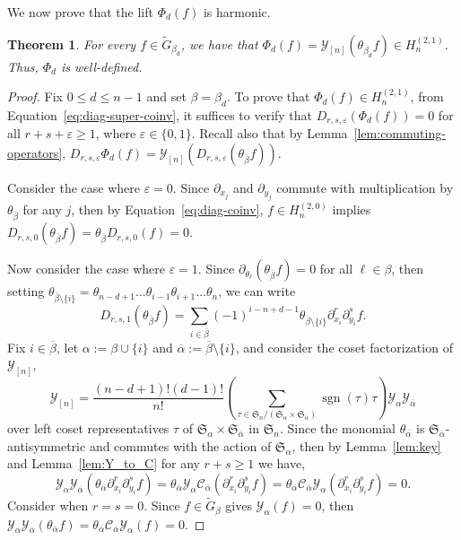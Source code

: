 \documentclass[11pt, noadjust, reqno]{amsart}
\newtheorem{theorem}{Theorem}[section]
\theoremstyle{definition}
\theoremstyle{remark}
\numberwithin{equation}{section}
\newcommand{\0}{\emptyset}
\renewcommand{\S}{\mathfrak{S}}
\newcommand{\cC}{\mathcal{C}}
\newcommand{\cY}{\mathcal{Y}}
\DeclareMathOperator{\sgn}{sgn}
\begin{document}
We now prove that the lift $\Phi_d(f)$ is harmonic.

\begin{theorem}\label{thm:harmonic-2-1}
    For every $f \in \widetilde{G}_{\beta_d}$, we have that $\Phi_d(f) = \cY_{[n]} (\theta_{\overline{\beta_d}} f) \in H_n^{(2,1)}$. Thus, $\Phi_d$ is well-defined.
\end{theorem}

\begin{proof} Fix $0\leq d \leq n-1$ and set $\beta = \beta_d$. 
    To prove that $\Phi_d(f) \in H_n^{(2,1)}$, from Equation~\eqref{eq:diag-super-coinv}, it suffices to verify that $D_{r,s,\varepsilon}(\Phi_d(f)) = 0$ for all $r+s+\varepsilon \geq 1$, where $\varepsilon \in \{0,1\}$.
    Recall also that by Lemma~\ref{lem:commuting-operators}, $D_{r,s,\varepsilon} \Phi_d(f) = \cY_{[n]}(D_{r,s,\varepsilon}(\theta_{\overline{\beta}} f))$.

    Consider the case where $\varepsilon=0$. 
    Since $\partial_{x_j}$ and $\partial_{y_j}$ commute with multiplication by $\theta_{\overline{\beta}}$ for any $j$, then by Equation~\eqref{eq:diag-coinv}, $f \in H_n^{(2,0)}$ implies $D_{r,s,0}(\theta_{\overline{\beta}} f) = \theta_{\overline{\beta}} D_{r,s,0}( f) = 0$.

    Now consider the case where $\varepsilon=1$.
    Since $\partial_{\theta_\ell}(\theta_{{\overline{\beta}}} f)=0$ for all $\ell \in \beta$, 
    then setting $\theta_{{\overline{\beta}} \setminus \{i\}}= \theta_{n-d+1} \dots \theta_{i-1} \theta_{i+1} \dots \theta_n$,
    we can write
    \begin{equation*}
        D_{r,s,1} (\theta_{\overline{\beta}} f) = 
        \sum_{i \in {\overline{\beta}}} (-1)^{i-n+d-1} \theta_{{\overline{\beta}} \setminus \{i\}} \partial_{x_i}^r \partial_{y_i}^s f.
    \end{equation*}
    Fix $i \in {\overline{\beta}}$, let $\alpha := \beta \cup \{i\}$ and $\overline{\alpha} := {\overline{\beta}} \setminus \{i\}$, and consider the coset factorization of $\cY_{[n]}$,
    \[\cY_{[n]} = \frac{(n-d+1)!(d-1)!}{n!}\left(\sum_{\tau \in  \S_n /  (\S_\alpha \times \S_{\overline{\alpha}})} \sgn(\tau) \tau \right) \cY_\alpha \cY_{\overline{\alpha}}
    \]
    over left coset representatives $\tau$ of $\mathfrak{S}_\alpha \times \mathfrak{S}_{\overline{\alpha}}$ in $\mathfrak{S}_n$. 
    Since the monomial $\theta_{\overline{\alpha}} $ is $\mathfrak{S}_{\overline{\alpha}}$-antisymmetric and commutes with the action of $\mathfrak{S}_\alpha$, then by Lemma~\ref{lem:key} and Lemma~\ref{lem:Y_to_C} for any $r+s \geq 1$ we have, 
    \[
\cY_\alpha \cY_{\overline{\alpha}} (\theta_{\overline{\alpha}} \partial_{x_i}^r \partial_{y_i}^s f) 
       =\theta_{\overline{\alpha}} \cY_\alpha\cC_{\overline{\alpha}}(\partial_{x_i}^r \partial_{y_i}^s f)
        = \theta_{\overline{\alpha}} \cC_{\overline{\alpha}}\cY_\alpha(\partial_{x_i}^r \partial_{y_i}^s f)=0.
    \]    
Consider when $r=s=0$. Since $f \in \widetilde{G}_\beta$ gives $\cY_\alpha(f) = 0$, then $\cY_\alpha\cY_{\overline{\alpha}}(\theta_{\overline{\alpha}}f)=\theta_{\overline{\alpha}}\cC_{\overline{\alpha}}\cY_\alpha(f) = 0$. 
    

\end{proof}
\end{document}
